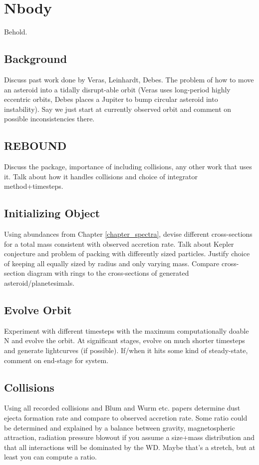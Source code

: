 \chapter{Nbody}
\label{chapter_nbody}

Behold. 


\section{Background}
\label{nbody_background}
Discuss past work done by Veras, Leinhardt, Debes. The problem of how to move an asteroid into a tidally disrupt-able orbit (Veras uses long-period highly eccentric orbits, Debes places a Jupiter to bump circular asteroid into instability). Say we just start at currently observed orbit and comment on possible inconsistencies there.

\section{REBOUND}
Discuss the package, importance of including collisions, any other work that uses it. Talk about how it handles collisions and choice of integrator method+timesteps.

\section{Initializing Object}
Using abundances from Chapter \ref{chapter_spectra}, devise different cross-sections for a total mass consistent with observed accretion rate. Talk about Kepler conjecture and problem of packing with differently sized particles. Justify choice of keeping all equally sized by radius and only varying mass. Compare cross-section diagram with rings to the cross-sections of generated asteroid/planetesimals. 

\section{Evolve Orbit}
Experiment with different timesteps with the maximum computationally doable N and evolve the orbit. At significant stages, evolve on much shorter timesteps and generate lightcurves (if possible). If/when it hits some kind of steady-state, comment on end-stage for system.

\section{Collisions}
Using all recorded collisions and Blum and Wurm etc. papers \citep[e.g.,][]{Beitz2016, Deckers2015} determine dust ejecta formation rate and compare to observed accretion rate. Some ratio could be determined and explained by a balance between gravity, magnetospheric attraction, radiation pressure blowout if you assume a size+mass distribution and that all interactions will be dominated by the WD. Maybe that's a stretch, but at least you can compute a ratio.

